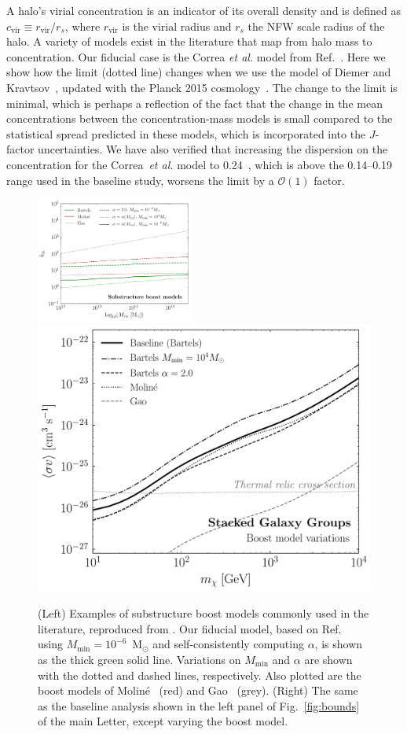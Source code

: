 A halo's virial concentration is an indicator of its overall density and is defined as $c_\text{vir} \equiv r_\text{vir}/r_s$, where $r_\text{vir}$ is the virial radius and $r_s$ the NFW scale radius of the halo.  A variety of models exist in the literature that map from halo mass to concentration.  Our fiducial case is the Correa \emph{et al.} model from Ref.~\cite{Correa:2015dva}.  Here we show how the limit (dotted line) changes when we use the model of Diemer and Kravtsov~\cite{Diemer:2014gba}, updated with the Planck 2015 cosmology~\cite{Ade:2015xua}.  The change to the limit is minimal, which is perhaps a reflection of the fact that the change in the mean concentrations between the concentration-mass models is small compared to the statistical spread predicted in these models, which is incorporated into the $J$-factor uncertainties.  We have also verified that increasing the dispersion on the concentration for the Correa~\emph{et al.} model to 0.24~\cite{Bullock:1999he}, which is above the 0.14--0.19 range used in the baseline study, worsens the limit by a $\mathcal{O}(1)$ factor.\vspace{0.1in}

\begin{figure}[t]
  \centering
  \includegraphics[width=0.46\textwidth]{ch-clusters/plots/boost_models_data.pdf} 
     \includegraphics[width=.45\textwidth]{ch-clusters/plots/systematics_boost.pdf}
  \caption{(Left) Examples of substructure boost models commonly used in the literature, reproduced from \cite{companion}. Our fiducial model, based on Ref.~\cite{Bartels:2015uba} using $M_\text{min} = 10^{-6}$~M$_\odot$ and self-consistently computing $\alpha$, is shown as the thick green solid line. Variations on $M_\text{min}$ and $\alpha$ are shown with the dotted and dashed lines, respectively. Also plotted are the boost models of Molin\'e~\cite{Moline:2016pbm} (red) and Gao~\cite{Gao:2011rf} (grey).  (Right) The same as the baseline analysis shown in the left panel of Fig.~\ref{fig:bounds} of the main Letter, except varying the boost model.
  }
  \label{fig:systematics_boost}
\end{figure}

